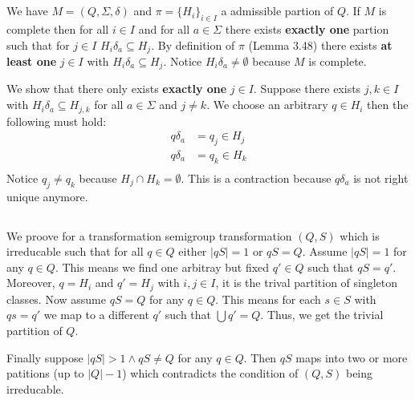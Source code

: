 \documentclass[a4paper,12pt,numbers=noenddot]{scrreport}
\begin{document}

\setcounter{chapter}{4}
\chapter{}
\section{}
We have $M = (Q, \Sigma, \delta)$ and $\pi = \{H_i\}_{i \in I}$ a admissible partion of $Q$.
If $M$ is complete then for all $i \in I$ and for all $a \in \Sigma$ there exists \textbf{exactly one} partion such that for $j \in I$ $H_i\delta_a \subseteq H_j$.
By definition of $\pi$ (Lemma 3.48) there exists \textbf{at least one} $j \in I$ with $H_i\delta_a \subseteq H_j$.
Notice $H_i\delta_a \neq \emptyset$ because $M$ is complete.

We show that there only exists \textbf{exactly one} $j \in I$.
Suppose there exists $j,k \in I$ with $H_i\delta_a \subseteq H_{j,k}$ for all $a \in \Sigma$ and $j \neq k$.
We choose an arbitrary $q \in H_i$ then the following must hold:
\begin{align*}
    q\delta_a &= q_j \in H_j \\
    q\delta_a &= q_k \in H_k \\
\end{align*}
Notice $q_j \neq q_k$ because $H_j \cap H_k = \emptyset$.
This is a contraction because $q\delta_a$ is not right unique anymore.

\section{}
We proove for a transformation semigroup transformation $(Q,S)$ which is irreducable such that for all $q \in Q$ either $|qS| = 1$  or $qS = Q$.
Assume $|qS| = 1$ for any $q \in Q$. This means we find one arbitray but fixed $q' \in Q$ such that $qS = q'$.
Moreover, $q = H_i$ and $q' = H_j$ with $i,j \in I$, it is the trival partition of singleton classes.
Now assume $qS = Q$ for any $q \in Q$. This means for each $s \in S$ with $qs = q'$ we map to a different $q'$ such that $\bigcup q' = Q$.
Thus, we get the trivial partition of $Q$.


Finally suppose $|qS| > 1 \land qS \neq Q$ for any $q \in Q$. Then $qS$ maps into two or more patitions (up to $|Q|-1$) which contradicts the condition of $(Q,S)$ being irreducable.
\end{document}
